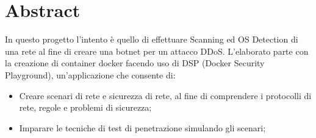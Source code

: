 \chapter{Abstract} 



In questo progetto l'intento è quello di effettuare Scanning ed OS Detection di una rete al fine di creare una botnet per un attacco DDoS. L'elaborato parte con la creazione di container docker facendo uso di DSP (Docker Security Playground), un'applicazione che consente di:
\begin{itemize}
\item Creare scenari di rete e sicurezza di rete, al fine di comprendere i protocolli di rete,
regole e problemi di sicurezza;
\item Imparare le tecniche di test di penetrazione simulando gli scenari;

\end{itemize}
